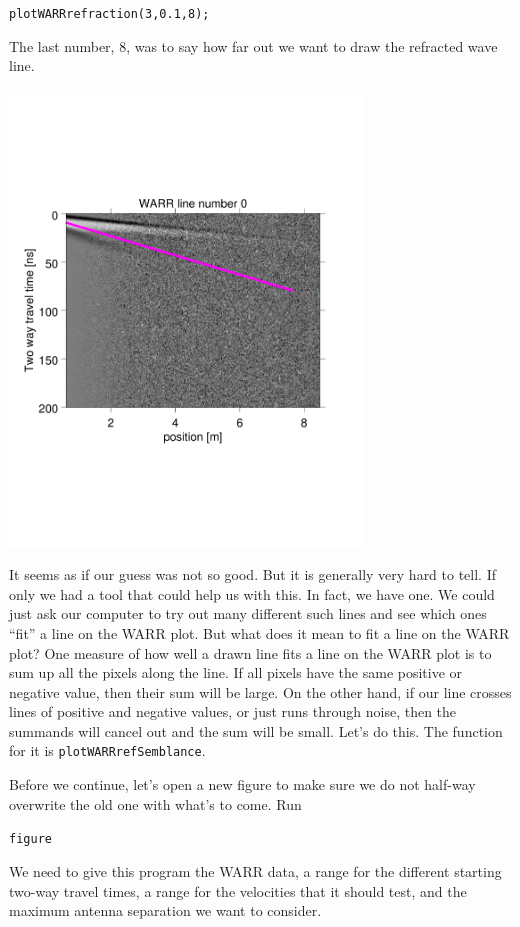 \documentclass[11pt]{article}
\begin{document}
\qquad \verb#plotWARRrefraction(3,0.1,8);#
  
The last number, 8, was to say how far out we want to draw the
  refracted wave line.
 
\begin{center}
\includegraphics[width=0.7\textwidth, trim = 0.9cm 6cm 2cm
  6.5cm,clip]{figures/WARRrefracted}
\end{center}

It seems as if our guess was not so good. But it is generally very
hard to tell. If only we had a tool that could help us with this. In
fact, we have one. We could just ask our computer to try out many
different such lines and see which ones ``fit'' a line on the WARR
plot. But what does it mean to fit a line on the WARR plot? One
measure of how well a drawn line fits a line on the WARR plot is to
sum up all the pixels along the line. If all pixels have the same
positive or negative value, then their sum will be large. On the other
hand, if our line crosses lines of positive and negative values, or
just runs through noise, then the summands will cancel out and the sum
will be small. Let's do this. The function for it is
\verb#plotWARRrefSemblance#.

Before we continue, let's open a new figure to make sure we do not
half-way overwrite the old one with what's to come. Run

\qquad\verb#figure#

We need to give this program the WARR data, a range for the different
starting two-way travel times, a range for the velocities that it
should test, and the maximum antenna separation we want to consider.
\end{document}
